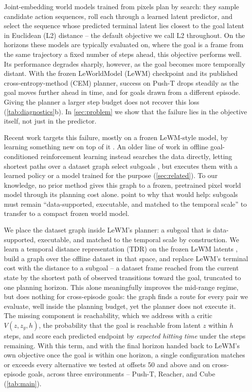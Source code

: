 \documentclass{article} %
\newcommand{\z}{z}
\begin{document}
Joint-embedding world models trained from pixels \citep{lewm,dinowm,pldm} plan by search: they
sample candidate action sequences, roll each through a learned latent predictor, and select the
sequence whose predicted terminal latent lies closest to the goal latent in Euclidean (L2)
distance -- the default objective we call L2 throughout. On the horizons these
models are typically evaluated on, where the goal is a frame from the same trajectory a fixed
number of steps ahead, this objective performs well. Its performance degrades sharply, however,
as the goal becomes more temporally distant. With the frozen LeWorldModel (LeWM) checkpoint and
its published cross-entropy-method (CEM) planner, success on Push-T drops steadily as the goal
moves further ahead in time, and for goals drawn from a different episode. Giving the
planner a larger step budget does not recover this loss (\cref{tab:diagnostics}b).
In \cref{sec:problem} we show that the failure lies in the objective itself, not just in the
predictor.

Recent work targets this failure, mostly on a frozen LeWM-style model, by learning something new
on top of it \citep{sage,hilewm,hwm,ffjepa,trm,tdjepa,rcaux}. An older line of work in offline
goal-conditioned reinforcement learning instead searches the data directly, letting shortest paths
over a dataset graph select subgoals \citep{sptm,sorb,sgm,gas,ttgs,alps}, but executes them with a
learned policy or a model trained for the purpose (\cref{sec:related}). To our knowledge, no prior
method gives this graph to a frozen, pretrained pixel world model through its planning cost alone.
\citet{hilewm} point to why that would help: subgoals must remain ``data-supported, executable,
and matched to the temporal scale'' to transfer to a compact frozen world model.

We place the dataset graph inside LeWM's planner: a subgoal that is data-supported,
executable, and matched to the temporal scale by construction. We learn a temporal distance
representation (TDR)
on the frozen LeWM latents \citep{hilp,gas}, build a graph over the offline dataset in that
space, and replace LeWM's terminal cost with the distance to a subgoal -- a dataset frame reached
from the current state by the shortest path of observed transitions toward the goal, truncated to
one planning horizon. This alone meaningfully improves the mid-range regime, but does nothing for
cross-episode goals: the graph finds a route for every pair we evaluate, well inside the planning
budget, yet the planner does not execute it. The missing component is reachability, which we
address with a critic $V(\z,\z_g,h)$, the probability that the goal is reachable from latent $\z$
within $h$ steps, and score each predicted endpoint by \emph{expected hitting time} under the
steps remaining. With this term, and with the final horizon handed
back to LeWM's own objective once the goal is within one horizon, a single configuration matches or
exceeds every alternative we tested at offsets 50 and above and on cross-episode goals, across
three environments -- Push-T, Reacher, and Cube (\cref{tab:main}).
\end{document}
